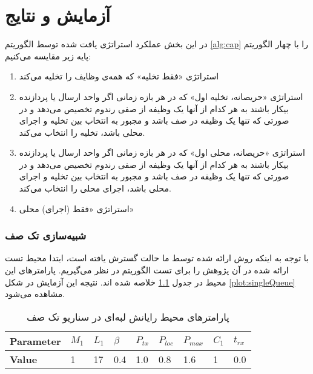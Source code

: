 \chapter{آزمایش و نتایج}
در این بخش عملکرد استراتژی یافت شده توسط الگوریتم \ref{alg:cap} را با چهار الگوریتم پایه زیر مقایسه می‌کنیم:
\begin{enumerate}
	\item استراتژی «فقط تخلیه» که همه‌ی وظایف را تخلیه می‌کند
	\item استراتژی «حریصانه، تخلیه اول» که در هر بازه زمانی اگر واحد ارسال یا پردازنده بیکار باشند به هر کدام از آنها یک وظیفه از صفی رندوم تخصیص می‌دهد و در صورتی که تنها یک وظیفه در صف باشد و مجبور به انتخاب بین تخلیه و اجرای محلی باشد، تخلیه را انتخاب می‌کند.
	\item استراتژی «حریصانه، محلی اول» که در هر بازه زمانی اگر واحد ارسال یا پردازنده بیکار باشند به هر کدام از آنها یک وظیفه از صفی رندوم تخصیص می‌دهد و در صورتی که تنها یک وظیفه در صف باشد و مجبور به انتخاب بین تخلیه و اجرای محلی باشد، اجرای محلی را انتخاب می‌کند.
	\item استراتژی «فقط (اجرای) محلی»
\end{enumerate}
\newpage
\subsection{شبیه‌سازی تک صف}
با توجه به اینکه روش ارائه شده توسط ما حالت گسترش یافته \cite{Liu} است، ابتدا محیط تست ارائه شده در آن پژوهش را برای تست الگوریتم در نظر می‌گیریم. پارامترهای این محیط در جدول \ref{table:parameters-singlequeue} خلاصه شده اند. نتیجه این آزمایش در شکل \ref{plot:singleQueue} مشاهده می‌شود.

\begin{table}[H]
	\centering
	\begin{latin}
		\begin{tabular}{@{}lllllllll@{}}
			\toprule
			\textbf{Parameter} & $M_1$ & $L_1$ & $\beta$ & $P_{tx}$ & $P_{loc}$ & $P_{max}$ & $C_1$ & $t_{rx}$ \\ \midrule
			\textbf{Value}             & 1    & 17   & 0.4  & 1.0 & 0.8  & 1.6  & 1    & 0.0   \\ \bottomrule
		\end{tabular}
	\end{latin}
	\caption{پارامترهای محیط رایانش لبه‌ای در سناریو تک صف}
	\label{table:parameters-singlequeue}
\end{table}

